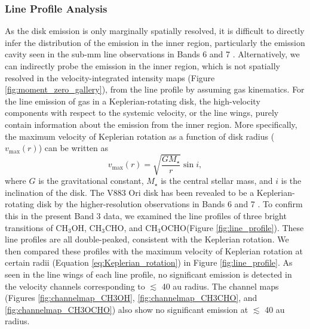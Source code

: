 \documentclass[linenumbers, twocolumn, twocolappendix, astrosymb, times]{aastex631}
\newcommand{\methanol}{CH$_3$OH\xspace}
\newcommand{\acetaldehyde}{CH$_3$CHO\xspace}
\newcommand{\methylformate}{CH$_3$OCHO\xspace}
\begin{document}
\subsubsection{Line Profile Analysis}\label{subsubsec:line_profile_analysis}
As the disk emission is only marginally spatially resolved, it is difficult to directly infer the distribution of the emission in the inner region, particularly the emission cavity seen in the sub-mm line observations in Bands 6 and 7 \citep{vantHoff2018, Lee2019, Tobin2023}. Alternatively, we can indirectly probe the emission in the inner region, which is not spatially resolved in the velocity-integrated intensity maps (Figure \ref{fig:moment_zero_gallery}), from the line profile by assuming gas kinematics. 
For the line emission of gas in a Keplerian-rotating disk, the high-velocity components with respect to the systemic velocity, or the line wings, purely contain information about the emission from the inner region. More specifically, the maximum velocity of Keplerian rotation as a function of disk radius ($v_\mathrm{max}(r)$) can be written as 
\begin{equation}\label{eq:Keplerian_rotation}
    v_\mathrm{max}(r) = \sqrt{\frac{GM_\star}{r}}\sin i,
\end{equation}
where $G$ is the gravitational constant, $M_\star$ is the central stellar mass, and $i$ is the inclination of the disk. The V883 Ori disk has been revealed to be a Keplerian-rotating disk by the higher-resolution observations in Bands 6 and 7 \citep{Cieza2016, Lee2019}. To confirm this in the present Band 3 data, we examined the line profiles of three bright transitions of \methanol, \acetaldehyde, and \methylformate (Figure \ref{fig:line_profile}). These line profiles are all double-peaked, consistent with the Keplerian rotation. We then compared these profiles with the maximum velocity of Keplerian rotation at certain radii (Equation \ref{eq:Keplerian_rotation}) in Figure \ref{fig:line_profile}. As seen in the line wings of each line profile, no significant emission is detected in the velocity channels corresponding to $\lesssim$ 40 au radius. The channel maps (Figures \ref{fig:channelmap_CH3OH}, \ref{fig:channelmap_CH3CHO}, and \ref{fig:channelmap_CH3OCHO}) also show no significant emission at $\lesssim$ 40 au radius. 


\begin{figure*}
\caption{Line profiles of \methanol $2_{-1,1}$ -- $1_{-1,0}$ E $v_t=0$, \acetaldehyde $5_{2,3}$ -- $4_{2,2}$ E $v_t=0$, and \methylformate $7_{6,1}$ -- $6_{6,0}$ E $v_t=0$. The vertical gray  dotted line marks the systemic velocity (4.25 km s$^{-1}$). The vertical blue dashed lines indicate the corresponding disk radii at each velocity channel based on the maximum velocity of Keplerian rotation in Equation (\ref{eq:Keplerian_rotation}). The horizontal gray dashed line indicates the zero-flux level. There are no significant emission at the velocity channels which corresponds to inside $\sim$ 40\,au radius.}
\label{fig:line_profile}
\end{figure*}
\end{document}
